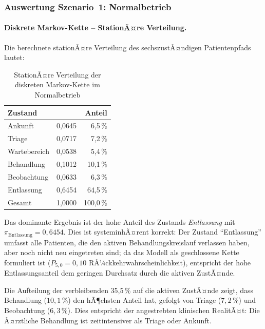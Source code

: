 ﻿\documentclass[a4paper,12pt]{scrreprt}
\theoremstyle{definition}
\begin{document}
\subsubsection{Auswertung Szenario~1: Normalbetrieb}

\paragraph{Diskrete Markov-Kette -- StationÃ¤re Verteilung.}
Die berechnete stationÃ¤re Verteilung des sechszustÃ¤ndigen Patientenpfads
lautet:

\begin{table}[H]
	\centering
	\begin{tabular}{@{}lrr@{}}
		\toprule
		\textbf{Zustand} & \boldmath{$\pi_i$} & \textbf{Anteil} \\
		\midrule
		Ankunft     & 0{,}0645 &  6{,}5\,\% \\
		Triage      & 0{,}0717 &  7{,}2\,\% \\
		Wartebereich& 0{,}0538 &  5{,}4\,\% \\
		Behandlung  & 0{,}1012 & 10{,}1\,\% \\
		Beobachtung & 0{,}0633 &  6{,}3\,\% \\
		Entlassung  & 0{,}6454 & 64{,}5\,\% \\
		\midrule
		Gesamt      & 1{,}0000 & 100{,}0\,\% \\
		\bottomrule
	\end{tabular}
	\caption{StationÃ¤re Verteilung der diskreten Markov-Kette im Normalbetrieb}
	\label{tab:pi-normal}
\end{table}

Das dominante Ergebnis ist der hohe Anteil des Zustands \emph{Entlassung}
mit $\pi_\text{Entlassung} = 0{,}6454$. Dies ist systeminhÃ¤rent korrekt:
Der Zustand ``Entlassung'' umfasst alle Patienten, die den aktiven
Behandlungskreislauf verlassen haben, aber noch nicht neu eingetreten sind;
da das Modell als geschlossene Kette formuliert ist ($P_{5,0} = 0{,}10$
RÃ¼ckkehrwahrscheinlichkeit), entspricht der hohe Entlassungsanteil
dem geringen Durchsatz durch die aktiven ZustÃ¤nde.

Die Aufteilung der verbleibenden 35{,}5\,\% auf die aktiven ZustÃ¤nde
zeigt, dass Behandlung ($10{,}1\,\%$) den hÃ¶chsten Anteil hat, gefolgt
von Triage ($7{,}2\,\%$) und Beobachtung ($6{,}3\,\%$). Dies entspricht
der angestrebten klinischen RealitÃ¤t: Die Ã¤rztliche Behandlung ist
zeitintensiver als Triage oder Ankunft.
\end{document}
